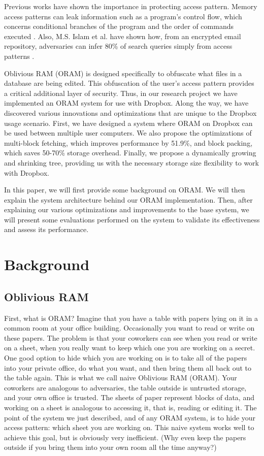 \documentclass[conference]{IEEEtran}
\begin{document}
Previous works have shown the importance in protecting access pattern. Memory access patterns can leak information such as a program’s control flow, which concerns conditional branches of the program and the order of commands executed \cite{HIDE}. Also, M.S. Islam et al. have shown how, from an encrypted email repository, adversaries can infer 80\% of search queries simply from access patterns \cite{Islam12}.

Oblivious RAM (ORAM) is designed specifically to obfuscate what files in a database are being edited. This obfuscation of the user’s access pattern provides a critical additional layer of security. Thus, in our research project we have implemented an ORAM system for use with Dropbox. Along the way, we have discovered various innovations and optimizations that are unique to the Dropbox usage scenario. First, we have designed a system where ORAM on Dropbox can be used between multiple user computers. We also propose the optimizations of multi-block fetching, which improves performance by 51.9\%, and block packing, which saves 50-70\% storage overhead. Finally, we propose a dynamically growing and shrinking tree, providing us with the necessary storage size flexibility to work with Dropbox.

In this paper, we will first provide some background on ORAM. We will then explain the system architecture behind our ORAM implementation. Then, after explaining our various optimizations and improvements to the base system, we will present some evaluations performed on the system to validate its effectiveness and assess its performance.


\section{Background}

\subsection{Oblivious RAM}
First, what is ORAM? Imagine that you have a table with papers lying on it in a common room at your office building. Occasionally you want to read or write on these papers. The problem is that your coworkers can see when you read or write on a sheet, when you really want to keep which one you are working on a secret. One good option to hide which you are working on is to take all of the papers into your private office, do what you want, and then bring them all back out to the table again. This is what we call naive Oblivious RAM (ORAM). Your coworkers are analogous to adversaries, the table outside is untrusted storage, and your own office is trusted. The sheets of paper represent blocks of data, and working on a sheet is analogous to accessing it, that is, reading or editing it. The point of the system we just described, and of any ORAM system, is to hide your access pattern: which sheet you are working on. This naive system works well to achieve this goal, but is obviously very inefficient. (Why even keep the papers outside if you bring them into your own room all the time anyway?)
\end{document}
